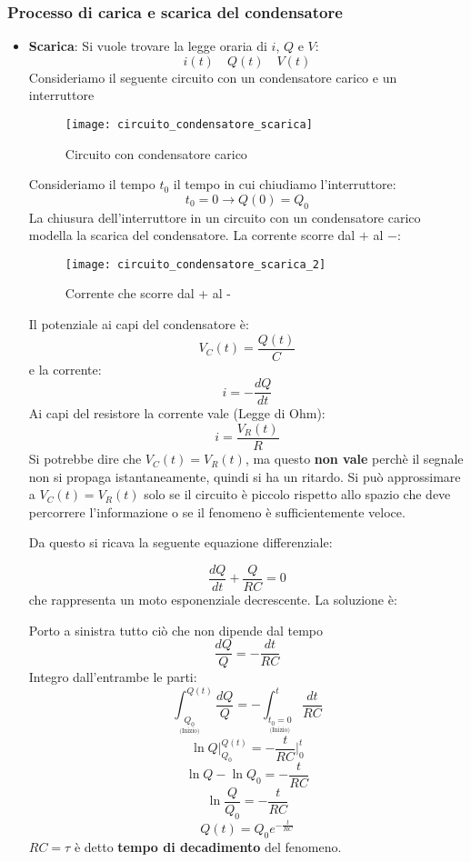 \documentclass[a4paper]{article}
\begin{document}
\subsubsection{Processo di carica e scarica del condensatore}
\begin{itemize}
  \item \textbf{Scarica}: Si vuole trovare la legge oraria di \( i \), \( Q \) e \( V \):
    \[
      i(t) \quad Q(t) \quad V(t)
    \] 
    Consideriamo il seguente circuito con un condensatore carico e un interruttore
    \begin{figure}[H]
      \centering
      \texttt{[image: circuito\_condensatore\_scarica]}
      \caption{Circuito con condensatore carico}
    \end{figure}
    \noindent
    Consideriamo il tempo \( t_0 \) il tempo in cui chiudiamo l'interruttore:
    \[
      t_0 = 0 \to Q(0) = Q_0
    \] 
    La chiusura dell'interruttore in un circuito con un condensatore carico modella
    la scarica del condensatore. La corrente scorre dal \( + \) al \( - \):
    \begin{figure}[H]
      \centering
      \texttt{[image: circuito\_condensatore\_scarica\_2]}
      \caption{Corrente che scorre dal + al -}
    \end{figure}
    \noindent
    Il potenziale ai capi del condensatore è:
    \[
      V_C(t) = \frac{Q(t)}{C}
    \] 
    e la corrente:
    \[
      i = - \frac{dQ}{dt}
    \] 
    Ai capi del resistore la corrente vale (Legge di Ohm):
    \[
      i = \frac{V_R(t)}{R}
    \] 
    Si potrebbe dire che \( V_C(t) = V_R(t) \), ma questo \textbf{non vale} perchè il segnale
    non si propaga istantaneamente, quindi si ha un ritardo. Si può approssimare
    a \( V_C(t) = V_R(t) \) solo se il circuito è piccolo rispetto allo spazio che 
    deve percorrere l'informazione o se il fenomeno è sufficientemente veloce.

    \vspace{1em}
    \noindent
    Da questo si ricava la seguente equazione differenziale:
    \begin{definition}
    \[
      \frac{dQ}{dt} + \frac{Q}{RC} = 0
    \] 
    che rappresenta un moto esponenziale decrescente. La soluzione è:

    Porto a sinistra tutto ciò che non dipende dal tempo
    \[
      \frac{dQ}{Q} = -\frac{dt}{RC}
    \] 
    Integro dall'entrambe le parti:
    \[
      \int_{\underset{\text{(Inizio)}}{Q_0}}^{Q(t)} \frac{dQ}{Q}
      = -\int_{\underset{\text{(Inizio)}}{t_0 = 0}}^t \frac{dt}{RC}
    \] 
    \[
      \ln Q \bigg|_{Q_0}^{Q(t)} = -\frac{t}{RC} \bigg|_{0}^{t}
    \] 
    \[
      \ln Q - \ln Q_0 = -\frac{t}{RC}
    \] 
    \[
      \ln \frac{Q}{Q_0} = -\frac{t}{RC}
    \] 
    \[
      Q(t) = Q_0 e^{-\frac{t}{RC}}
    \] 
    \( RC = \tau \) è detto \textbf{tempo di decadimento} del fenomeno.


\end{definition}
\end{itemize}
\end{document}
